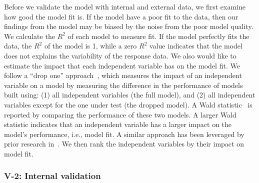 Before we validate the model with internal and external data, we first examine how good the model fit is. If the model have a poor fit to the data, then our findings from the model may be biased by the noise from the poor model quality. We calculate the $R^2$ of each model to measure fit. If the model perfectly fits the data, the $R^2$ of the model is 1, while a zero $R^2$ value indicates that the model does not explains the variability of the response data. We also would like to estimate the impact that each independent variable has on the model fit. We follow a ``drop one'' approach~\cite{Chambers1990}, which measures the impact of an independent variable on a model by measuring the difference in the performance of models built using: (1) all independent variables (the full model), and (2) all independent variables except for the one under test (the dropped model). A Wald statistic~\cite{harrell2015regression} is reported by comparing the performance of these two models. A larger Wald statistic indicates that an independent variable has a larger impact on the model's performance, i.e., model fit. A similar approach has been leveraged by prior research in~\cite{mcintosh2015emse}. We then rank the independent variables by their impact on model fit. 



\subsubsection{V-2: Internal validation}

